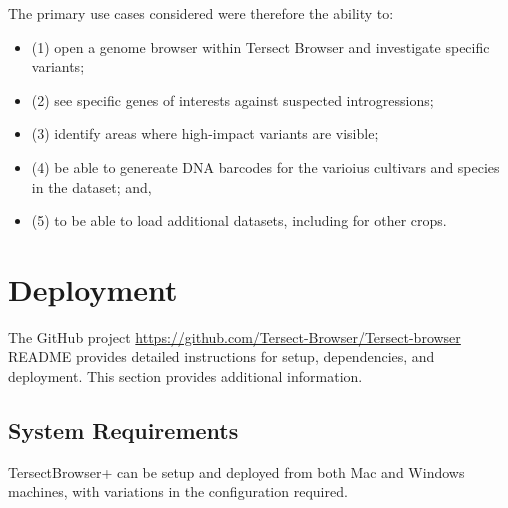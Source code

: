 \documentclass[12pt]{article}
\begin{document}
The primary use cases considered were therefore the ability to: 

\begin{itemize}
    \item (1) open a genome browser within Tersect Browser and investigate specific variants;
    \item (2) see specific genes of interests against suspected introgressions; 
    \item (3) identify areas where high-impact variants are visible; 
    \item (4) be able to genereate DNA barcodes for the varioius cultivars and species in the dataset; and,  
    \item (5) to be able to load additional datasets, including for other crops. 
\end{itemize}


\section{Deployment}
The GitHub project \url{https://github.com/Tersect-Browser/Tersect-browser} README provides detailed instructions for setup, dependencies, and deployment. This section provides additional information. 


\subsection{System Requirements}
TersectBrowser+ can be setup and deployed from both Mac and Windows machines, with variations in the configuration required. 
\end{document}

